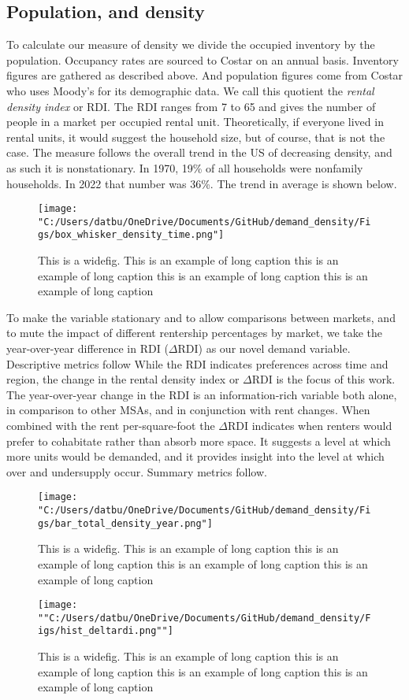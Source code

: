 \documentclass[sn-mathphys-num]{sn-jnl}%
\theoremstyle{thmstyleone}%
\theoremstyle{thmstyletwo}%
\theoremstyle{thmstylethree}%
\begin{document}
\subsection{Population, and density}
To calculate our measure of density we divide the occupied inventory by the population. Occupancy rates are sourced to Costar on an annual basis. Inventory figures are gathered as described above. And population figures come from Costar who uses Moody's for its demographic data. We call this quotient the \textit{rental density index} or RDI. The RDI ranges from 7 to 65 and gives the number of people in a market per occupied rental unit. Theoretically, if everyone lived in rental units, it would suggest the household size, but of course, that is not the case. The measure follows the overall trend in the US of decreasing density, and as such it is nonstationary. In 1970, 19\% of all households were nonfamily households. In 2022 that number was 36\%. The trend in average is shown below.

\begin{figure}[H]
	\centering
	\texttt{[image: "C:/Users/datbu/OneDrive/Documents/GitHub/demand\_density/Figs/box\_whisker\_density\_time.png"]}
	\caption{This is a widefig. This is an example of long caption this is an example of long caption  this is an example of long caption this is an example of long caption}\label{fig1}
\end{figure}

To make the variable stationary and to allow comparisons between markets, and to mute the impact of different rentership percentages by market, we take the year-over-year difference in RDI ($\Delta\text{RDI}$) as our novel demand variable. Descriptive metrics follow
While the RDI indicates preferences across time and region, the change in the rental density index or $\Delta\text{RDI}$ is the focus of this work. The year-over-year change in the RDI is an information-rich variable both alone, in comparison to other MSAs, and in conjunction with rent changes. When combined with the rent per-square-foot the $\Delta\text{RDI}$ indicates when renters would prefer to cohabitate rather than absorb more space. It suggests a level at which more units would be demanded, and it provides insight into the level at which over and undersupply occur. 
Summary metrics follow.

\begin{figure}[H]
	\centering
	\texttt{[image: "C:/Users/datbu/OneDrive/Documents/GitHub/demand\_density/Figs/bar\_total\_density\_year.png"]}
	\caption{This is a widefig. This is an example of long caption this is an example of long caption  this is an example of long caption this is an example of long caption}\label{fig2}
\end{figure}
\begin{figure}[H]
	\centering
	\texttt{[image: ""C:/Users/datbu/OneDrive/Documents/GitHub/demand\_density/Figs/hist\_deltardi.png""]}
	\caption{This is a widefig. This is an example of long caption this is an example of long caption  this is an example of long caption this is an example of long caption}\label{fig3}
\end{figure}
\end{document}
